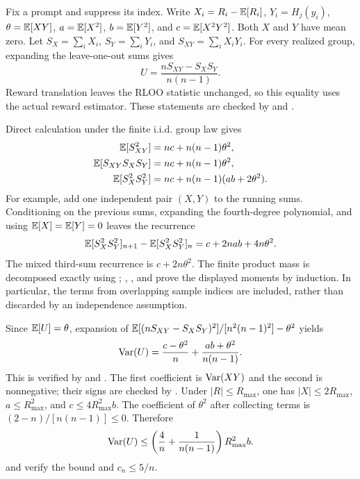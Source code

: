 Fix a prompt and suppress its index. Write $X_i=R_i-\mathbb{E}[R_i]$,
$Y_i=H_j(y_i)$, $\theta=\mathbb{E}[XY]$, $a=\mathbb{E}[X^2]$, $b=\mathbb{E}[Y^2]$, and
$c=\mathbb{E}[X^2Y^2]$. Both $X$ and $Y$ have mean zero. Let
$S_X=\sum_i X_i$, $S_Y=\sum_i Y_i$, and $S_{XY}=\sum_i X_iY_i$.
For every realized group, expanding the leave-one-out sums gives
\begin{equation*}
    U=\frac{nS_{XY}-S_XS_Y}{n(n-1)}.
\end{equation*}
Reward translation leaves the RLOO statistic unchanged, so this equality
uses the actual reward estimator. These statements are checked by
 and .

Direct calculation under the finite i.i.d. group law gives
\begin{align*}
    \mathbb{E}[S_{XY}^2]&=nc+n(n-1)\theta^2,\\
    \mathbb{E}[S_{XY}S_XS_Y]&=nc+n(n-1)\theta^2,\\
    \mathbb{E}[S_X^2S_Y^2]&=nc+n(n-1)(ab+2\theta^2).
\end{align*}
For example, add one independent pair $(X,Y)$ to the running sums.
Conditioning on the previous sums, expanding the fourth-degree polynomial,
and using $\mathbb{E}[X]=\mathbb{E}[Y]=0$ leaves the recurrence
\begin{equation*}
    \mathbb{E}[S_X^2S_Y^2]_{n+1}-\mathbb{E}[S_X^2S_Y^2]_n
       =c+2nab+4n\theta^2.
\end{equation*}
The mixed third-sum recurrence is $c+2n\theta^2$.
The finite product mass is decomposed exactly using
; ,
, and
 prove the displayed moments by
induction. In particular, the terms from overlapping sample indices are
included, rather than discarded by an independence assumption.

Since $\mathbb{E}[U]=\theta$, expansion of
$\mathbb{E}[(nS_{XY}-S_XS_Y)^2]/[n^2(n-1)^2]-\theta^2$ yields
\begin{equation*}
    \mathrm{Var}(U)=\frac{c-\theta^2}{n}
              +\frac{ab+\theta^2}{n(n-1)}.
\end{equation*}
This is verified by  and
. The first coefficient is $\mathrm{Var}(XY)$ and
the second is nonnegative; their signs are checked by
.
Under $|R|\le R_{\max}$, one has $|X|\le2R_{\max}$,
$a\le R_{\max}^2$, and $c\le4R_{\max}^2b$. The coefficient of
$\theta^2$ after collecting terms is $(2-n)/[n(n-1)]\le0$. Therefore
\begin{equation*}
    \mathrm{Var}(U)\le
       \left(\frac4n+\frac{1}{n(n-1)}\right)R_{\max}^2 b.
\end{equation*}
 and
 verify the bound and $c_n\le5/n$.

